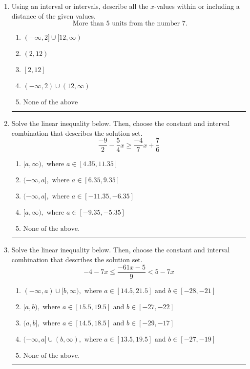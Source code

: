 \documentclass[14pt]{extbook}
\newcommand{\litem}[1]{\item#1\hspace*{-1cm}\rule{\textwidth}{0.4pt}}
\begin{document}
\begin{enumerate}
{\begin{enumerate}[label=\Alph*.]
\end{enumerate} }
\litem{
Using an interval or intervals, describe all the $x$-values within or including a distance of the given values.\[ \text{ More than } 5 \text{ units from the number } 7. \]\begin{enumerate}[label=\Alph*.]
\item \( (-\infty, 2] \cup [12, \infty) \)
\item \( (2, 12) \)
\item \( [2, 12] \)
\item \( (-\infty, 2) \cup (12, \infty) \)
\item \( \text{None of the above} \)

\end{enumerate} }
\litem{
Solve the linear inequality below. Then, choose the constant and interval combination that describes the solution set.\[ \frac{-9}{2} - \frac{5}{4} x \geq \frac{-4}{7} x + \frac{7}{6} \]\begin{enumerate}[label=\Alph*.]
\item \( [a, \infty), \text{ where } a \in [4.35, 11.35] \)
\item \( (-\infty, a], \text{ where } a \in [6.35, 9.35] \)
\item \( (-\infty, a], \text{ where } a \in [-11.35, -6.35] \)
\item \( [a, \infty), \text{ where } a \in [-9.35, -5.35] \)
\item \( \text{None of the above}. \)

\end{enumerate} }
\litem{
Solve the linear inequality below. Then, choose the constant and interval combination that describes the solution set.\[ -4 - 7 x \leq \frac{-61 x - 5}{9} < 5 - 7 x \]\begin{enumerate}[label=\Alph*.]
\item \( (-\infty, a) \cup [b, \infty), \text{ where } a \in [14.5, 21.5] \text{ and } b \in [-28, -21] \)
\item \( [a, b), \text{ where } a \in [15.5, 19.5] \text{ and } b \in [-27, -22] \)
\item \( (a, b], \text{ where } a \in [14.5, 18.5] \text{ and } b \in [-29, -17] \)
\item \( (-\infty, a] \cup (b, \infty), \text{ where } a \in [13.5, 19.5] \text{ and } b \in [-27, -19] \)
\item \( \text{None of the above.} \)


\end{enumerate}}
\end{enumerate}
\end{document}
